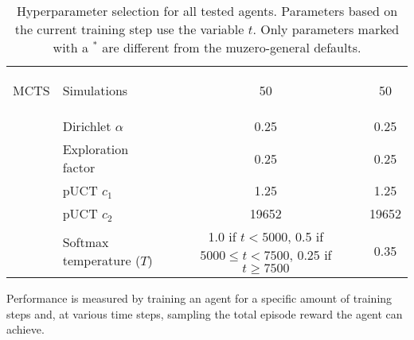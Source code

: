 \begin{table}[ht]
\begin{tabular}{|c|l||c|c|}
        \hline

        \multirow{7.5}{*}{\begin{sideways}MCTS\end{sideways}} & Simulations & 50 & 50 \\
        \cline{2-4}
        & Dirichlet $\alpha$ & 0.25 & 0.25 \\
        \cline{2-4}
        & Exploration factor & 0.25 & 0.25 \\
        \cline{2-4}
        & pUCT $c_1$ & 1.25 & 1.25 \\
        \cline{2-4}
        & pUCT $c_2$ & 19652 & 19652 \\
        \cline{2-4}
        & Softmax temperature ($T$) & \makecell{
            1.0 if $t<5000$, \\ 0.5 if $5000 \leq t < 7500$, \\ 0.25 if $t \geq 7500$
        } & 0.35 \\

        \hline
    \end{tabular}
    \caption{Hyperparameter selection for all tested agents. Parameters based on the current training step use the variable $t$. Only parameters marked with a $^*$ are different from the muzero-general defaults.}
    \label{tab:hyperparameters}
\end{table}

 Performance is measured by training an agent for a specific amount of training steps and, at various time steps, sampling the total episode reward the agent can achieve.
